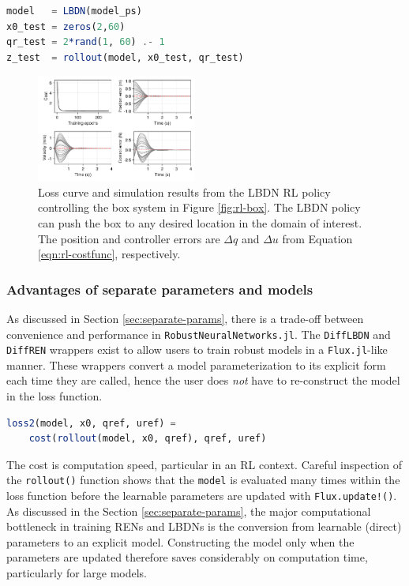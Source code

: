 \begin{lstlisting}[language=Julia]
model   = LBDN(model_ps)
x0_test = zeros(2,60)
qr_test = 2*rand(1, 60) .- 1
z_test  = rollout(model, x0_test, qr_test)
\end{lstlisting}

\begin{figure}
    \centering
    \includegraphics[width=0.47\textwidth]{Images/lbdn_rl.pdf}
    \caption{Loss curve and simulation results from the LBDN RL policy controlling the box system in Figure \ref{fig:rl-box}. The LBDN policy can push the box to any desired location in the domain of interest. The position and controller errors are $\Delta q$ and $\Delta u$ from Equation \ref{eqn:rl-costfunc}, respectively.}
    \label{fig:rl-results}
\end{figure}

\subsubsection{Advantages of separate parameters and models} \label{sec:rl-comptime}

As discussed in Section \ref{sec:separate-params}, there is a trade-off between convenience and performance in \verb|RobustNeuralNetworks.jl|. The \verb|DiffLBDN| and \verb|DiffREN| wrappers exist to allow users to train robust models in a \verb|Flux.jl|-like manner. These wrappers convert a model parameterization to its explicit form each time they are called, hence the user does \textit{not} have to re-construct the model in the loss function.
\begin{lstlisting}[language = Julia]
loss2(model, x0, qref, uref) = 
    cost(rollout(model, x0, qref), qref, uref)
\end{lstlisting}

The cost is computation speed, particular in an RL context. Careful inspection of the \verb|rollout()| function shows that the \verb|model| is evaluated many times within the loss function before the learnable parameters are updated with \verb|Flux.update!()|. As discussed in the Section \ref{sec:separate-params}, the major computational bottleneck in training RENs and LBDNs is the conversion from learnable (direct) parameters to an explicit model. Constructing the model only when the parameters are updated therefore saves considerably on computation time, particularly for large models.

